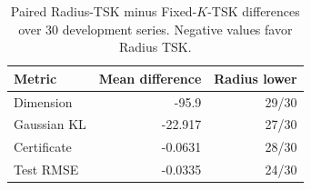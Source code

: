 \begin{table}[htbp]
\centering
\caption{Paired Radius-TSK minus Fixed-$K$-TSK differences over 30 development series. Negative values favor Radius TSK.}
\label{tab:structural_pairwise}
\small
\setlength{\tabcolsep}{4pt}
\begin{tabular}{lrr}
\toprule
Metric & Mean difference & Radius lower \\
\midrule
Dimension & -95.9 & 29/30 \\
Gaussian KL & -22.917 & 27/30 \\
Certificate & -0.0631 & 28/30 \\
Test RMSE & -0.0335 & 24/30 \\
\bottomrule
\end{tabular}
\end{table}
